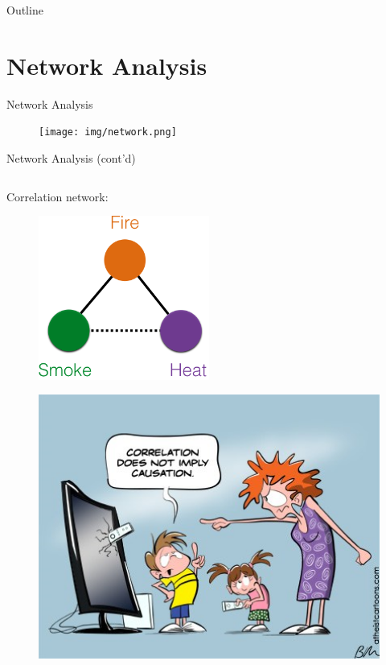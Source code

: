\documentclass{beamer}
\begin{document}
\begin{frame}{Outline}
	\tableofcontents
\end{frame}

\section{Network Analysis}
\begin{frame}{Network Analysis}
	\begin{figure}[ht]
		\centering
		\texttt{[image: img/network.png]}
		\caption*{\label{fig:network}}
	\end{figure}
\end{frame}
\begin{frame}{Network Analysis (cont'd)}
	\begin{columns}
		\begin{column}[t]{.48\textwidth}
			Correlation network:
			\begin{figure}[ht]
				\centering
				\includegraphics[width=0.5\textwidth]{img/correlation.png}
				\caption*{\label{fig:correlation-network}}
			\end{figure}
			\vspace{-1.5cm}
			\begin{figure}[ht]
				\centering
				\includegraphics[width=1\textwidth,height=0.4\textheight]{img/correlation-causation.png}

\end{figure}
\end{column}
\end{columns}
\end{frame}
\end{document}
